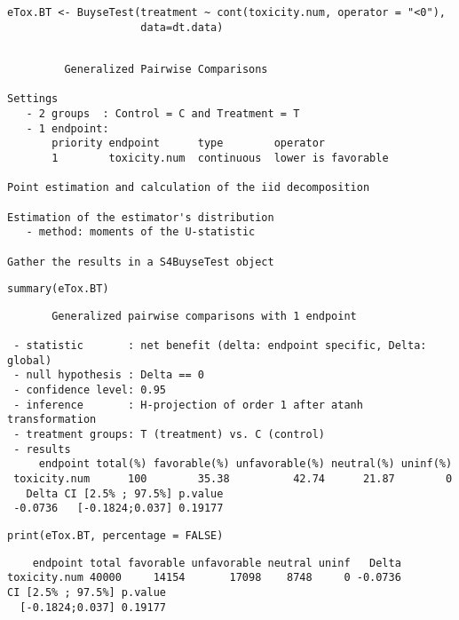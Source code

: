 \documentclass[12pt]{article}
\begin{document}
\lstset{language=r,label= ,caption= ,captionpos=b,numbers=none}
\begin{lstlisting}
eTox.BT <- BuyseTest(treatment ~ cont(toxicity.num, operator = "<0"),
                     data=dt.data)
\end{lstlisting}

\begin{verbatim}

         Generalized Pairwise Comparisons

Settings 
   - 2 groups  : Control = C and Treatment = T
   - 1 endpoint: 
       priority endpoint      type        operator           
       1        toxicity.num  continuous  lower is favorable 

Point estimation and calculation of the iid decomposition

Estimation of the estimator's distribution 
   - method: moments of the U-statistic

Gather the results in a S4BuyseTest object
\end{verbatim}

\lstset{language=r,label= ,caption= ,captionpos=b,numbers=none}
\begin{lstlisting}
summary(eTox.BT)
\end{lstlisting}

\begin{verbatim}
       Generalized pairwise comparisons with 1 endpoint

 - statistic       : net benefit (delta: endpoint specific, Delta: global) 
 - null hypothesis : Delta == 0 
 - confidence level: 0.95 
 - inference       : H-projection of order 1 after atanh transformation 
 - treatment groups: T (treatment) vs. C (control) 
 - results
     endpoint total(%) favorable(%) unfavorable(%) neutral(%) uninf(%)
 toxicity.num      100        35.38          42.74      21.87        0
   Delta CI [2.5% ; 97.5%] p.value 
 -0.0736   [-0.1824;0.037] 0.19177
\end{verbatim}

\lstset{language=r,label= ,caption= ,captionpos=b,numbers=none}
\begin{lstlisting}
print(eTox.BT, percentage = FALSE)
\end{lstlisting}

\begin{verbatim}
    endpoint total favorable unfavorable neutral uninf   Delta
toxicity.num 40000     14154       17098    8748     0 -0.0736
CI [2.5% ; 97.5%] p.value
  [-0.1824;0.037] 0.19177
\end{verbatim}
\end{document}
